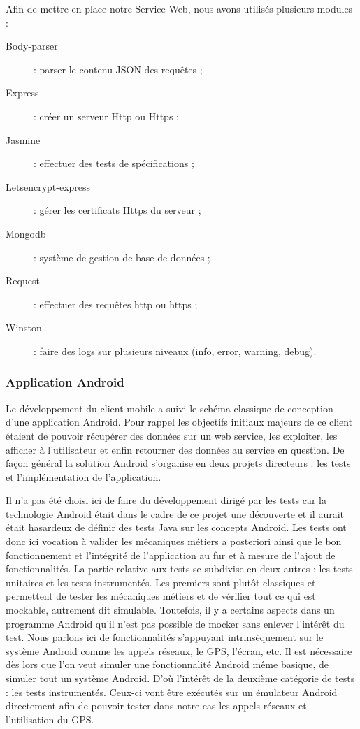             Afin de mettre en place notre Service Web, nous avons utilisés plusieurs modules :
            \begin{description}
                \item [Body-parser] : parser le contenu JSON des requêtes ;
                \item [Express] : créer un serveur Http ou Https ;
                \item [Jasmine] : effectuer des tests de spécifications ;
                \item [Letsencrypt-express] : gérer les certificats Https du serveur ;
                \item [Mongodb] : système de gestion de base de données ;
                \item [Request] : effectuer des requêtes http ou https ;
                \item [Winston] : faire des logs sur plusieurs niveaux (info, error, warning, debug).
            \end{description}

        \subsubsection{Application Android}
            Le développement du client mobile a suivi le schéma classique de conception d’une application Android. Pour rappel les objectifs initiaux majeurs de ce client étaient de pouvoir récupérer des données sur un web service, les exploiter, les afficher à l’utilisateur et enfin retourner des données au service en question. De façon général la solution Android s’organise en deux projets directeurs : les tests et l’implémentation de l’application.

            Il n’a pas été choisi ici de faire du développement dirigé par les tests car la technologie Android était dans le cadre de ce projet une découverte et il aurait était hasardeux de définir des tests Java sur les concepts Android. Les tests ont donc ici vocation à valider les mécaniques métiers a posteriori ainsi que le bon fonctionnement et l’intégrité de l’application au fur et à mesure de l’ajout de fonctionnalités. La partie relative aux tests se subdivise en deux autres : les tests unitaires et les tests instrumentés. Les premiers sont plutôt classiques et permettent de tester les mécaniques métiers et de vérifier tout ce qui est mockable, autrement dit simulable. Toutefois, il y a certains aspects dans un programme Android qu’il n’est pas possible de mocker sans enlever l’intérêt du test. Nous parlons ici de fonctionnalités s’appuyant intrinsèquement sur le système Android comme les appels réseaux, le GPS, l’écran, etc. Il est nécessaire dès lors que l’on veut simuler une fonctionnalité Android même basique, de simuler tout un système Android. D’où l’intérêt de la deuxième catégorie de tests : les tests instrumentés. Ceux-ci vont être exécutés sur un émulateur Android directement afin de pouvoir tester dans notre cas les appels réseaux et l’utilisation du GPS.

